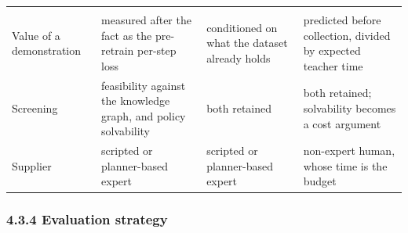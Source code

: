 \documentclass[
  11pt,
]{article}
\begin{document}
\begin{longtable}[]{@{}llll@{}}
\begin{minipage}[t]{0.24\columnwidth}
\end{minipage}\tabularnewline
\begin{minipage}[t]{0.16\columnwidth}\raggedright
Value of a demonstration\strut
\end{minipage} & \begin{minipage}[t]{0.24\columnwidth}\raggedright
measured after the fact as the pre-retrain per-step loss\strut
\end{minipage} & \begin{minipage}[t]{0.24\columnwidth}\raggedright
conditioned on what the dataset already holds\strut
\end{minipage} & \begin{minipage}[t]{0.24\columnwidth}\raggedright
predicted before collection, divided by expected teacher time\strut
\end{minipage}\tabularnewline
\begin{minipage}[t]{0.16\columnwidth}\raggedright
Screening\strut
\end{minipage} & \begin{minipage}[t]{0.24\columnwidth}\raggedright
feasibility against the knowledge graph, and policy solvability\strut
\end{minipage} & \begin{minipage}[t]{0.24\columnwidth}\raggedright
both retained\strut
\end{minipage} & \begin{minipage}[t]{0.24\columnwidth}\raggedright
both retained; solvability becomes a cost argument\strut
\end{minipage}\tabularnewline
\begin{minipage}[t]{0.16\columnwidth}\raggedright
Supplier\strut
\end{minipage} & \begin{minipage}[t]{0.24\columnwidth}\raggedright
scripted or planner-based expert\strut
\end{minipage} & \begin{minipage}[t]{0.24\columnwidth}\raggedright
scripted or planner-based expert\strut
\end{minipage} & \begin{minipage}[t]{0.24\columnwidth}\raggedright
non-expert human, whose time is the budget\strut
\end{minipage}\tabularnewline
\bottomrule
\end{longtable}

\hypertarget{evaluation-strategy-1}{%
\subsubsection{4.3.4 Evaluation strategy}\label{evaluation-strategy-1}}
\end{document}
